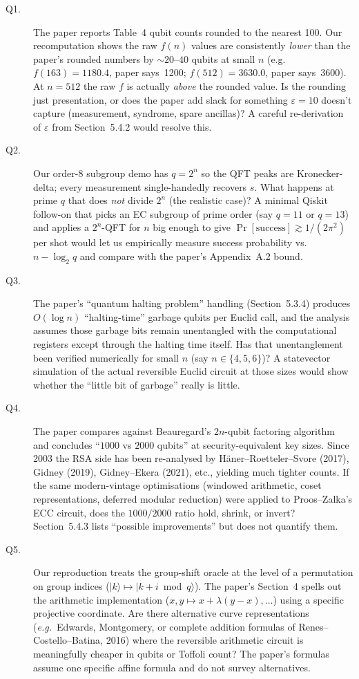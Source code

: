 \begin{description}
  \item[Q1.] The paper reports Table~4 qubit counts rounded to the nearest 100.
  Our recomputation shows the raw $f(n)$ values are consistently
  \emph{lower} than the paper's rounded numbers by $\sim20$--$40$ qubits at
  small $n$ (e.g.\ $f(163)=1180.4$, paper says~1200; $f(512)=3630.0$,
  paper says~3600). At $n=512$ the raw $f$ is actually \emph{above} the
  rounded value.  Is the rounding just presentation, or does the paper
  add slack for something $\varepsilon=10$ doesn't capture (measurement,
  syndrome, spare ancillas)?  A careful re-derivation of $\varepsilon$
  from Section~5.4.2 would resolve this.
  \item[Q2.] Our order-8 subgroup demo has $q=2^n$ so the QFT peaks are
  Kronecker-delta; every measurement single-handedly recovers $s$.  What
  happens at prime $q$ that does \emph{not} divide $2^n$ (the realistic
  case)?  A minimal Qiskit follow-on that picks an EC subgroup of prime
  order (say $q=11$ or $q=13$) and applies a $2^n$-QFT for $n$ big enough
  to give $\Pr[\text{success}]\!\gtrsim\!1/(2\pi^2)$ per shot would let
  us empirically measure success probability vs.\ $n{-}\log_2 q$ and
  compare with the paper's Appendix~A.2 bound.
  \item[Q3.] The paper's ``quantum halting problem'' handling (Section~5.3.4)
  produces $O(\log n)$ ``halting-time'' garbage qubits per Euclid call, and
  the analysis assumes those garbage bits remain unentangled with the
  computational registers except through the halting time itself.  Has
  that unentanglement been verified numerically for small $n$
  (say $n\!\in\!\{4,5,6\}$)?  A statevector simulation of the actual
  reversible Euclid circuit at those sizes would show whether the
  ``little bit of garbage'' really is little.
  \item[Q4.] The paper compares against Beauregard's $2n$-qubit factoring
  algorithm and concludes ``$1000$ vs $2000$ qubits'' at security-equivalent
  key sizes.  Since 2003 the RSA side has been re-analysed by
  H\"aner--Roetteler--Svore (2017), Gidney (2019), Gidney--Ekera (2021),
  etc., yielding much tighter counts.  If the same modern-vintage
  optimisations (windowed arithmetic, coset representations, deferred
  modular reduction) were applied to Proos--Zalka's ECC circuit, does
  the $1000/2000$ ratio hold, shrink, or invert?  Section~5.4.3 lists
  ``possible improvements'' but does not quantify them.
  \item[Q5.] Our reproduction treats the group-shift oracle at the level of
  a permutation on group indices ($|k\rangle\mapsto|k{+}i\bmod q\rangle$).
  The paper's Section~4 spells out the arithmetic implementation
  ($x,y\mapsto x+\lambda(y-x),\dots$) using a specific projective
  coordinate.  Are there alternative curve representations
  (\emph{e.g.}\ Edwards, Montgomery, or complete addition formulas of
  Renes--Costello--Batina, 2016) where the reversible arithmetic circuit
  is meaningfully cheaper in qubits or Toffoli count?  The paper's
  formulas assume one specific affine formula and do not survey
  alternatives.
\end{description}
